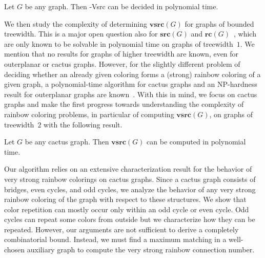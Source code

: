 \documentclass[letter,runningheads,envcountsame,envcountsect]{llncs}
\newcommand{\vsrc}{\mathbf{vsrc}}
\newcommand{\src}{\mathbf{src}}
\newcommand{\rc}{\mathbf{rc}}
\newcommand{\twovsrc}{{\sc 2-Vsrc}}
\begin{document}
\begin{proposition} \label{prp:two}
Let $G$ be any graph. Then {\twovsrc} can be decided in polynomial time.
\end{proposition}

%
We then study the complexity of determining $\vsrc(G)$ for graphs of bounded treewidth. This is a major open question also for $\src(G)$ and $\rc(G)$~\cite{lauri2016chasing}, which are only known to be solvable in polynomial time on graphs of treewidth~$1$. We mention that no results for graphs of higher treewidth are known, even for outerplanar or cactus graphs. However, for the slightly different problem of deciding whether an already given coloring forms a (strong) rainbow coloring of a given graph, a polynomial-time algorithm for cactus graphs and an NP-hardness result for outerplanar graphs are known~\cite{uchizawa2013rainbow}. With this in mind, we focus on cactus graphs and make the first progress towards understanding the complexity of rainbow coloring problems, in particular of computing $\vsrc(G)$, on graphs of treewidth~$2$ with the following result.

\begin{theorem} \label{thm:cactus}
Let $G$ be any cactus graph. Then $\vsrc(G)$ can be computed in polynomial time.
\end{theorem}
%
Our algorithm relies on an extensive characterization result for the behavior of very strong rainbow colorings on cactus graphs. Since a cactus graph consists of bridges, even cycles, and odd cycles, we analyze the behavior of any very strong rainbow coloring of the graph with respect to these structures. We show that color repetition can mostly occur only within an odd cycle or even cycle. 
Odd cycles can repeat some colors from outside but we characterize how they can be repeated.
However, our arguments are not sufficient to derive a completely combinatorial bound. Instead, we must find a maximum matching in a well-chosen auxiliary graph to compute the very strong rainbow connection number.
\end{document}
